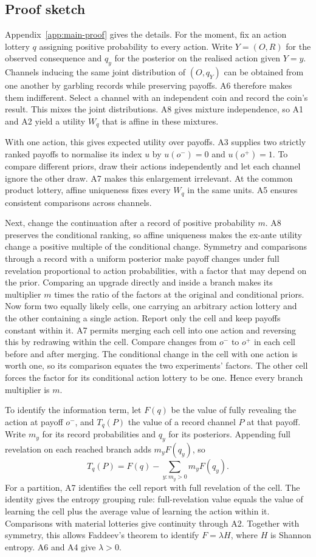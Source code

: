 \documentclass[11pt,a4paper]{article}
\theoremstyle{definition}
\newcommand{\1}{\mathbf 1}
\begin{document}
\subsection{Proof sketch}

Appendix~\ref{app:main-proof} gives the details. For the moment, fix an action lottery $q$ assigning positive probability to every action.
Write $Y=(O,R)$ for the observed consequence and $q_y$ for the posterior
on the realised action given $Y=y$. Channels inducing the same joint
distribution of $(O,q_Y)$ can be obtained from one another by garbling
records while preserving payoffs. A6 therefore makes them indifferent.
Select a channel with an independent coin and record the coin's result.
This mixes the joint distributions. A8 gives mixture independence, so A1
and A2 yield a utility $W_q$ that is affine in these mixtures.

With one action, this gives expected utility over payoffs. A3 supplies
two strictly ranked payoffs to normalise its index $u$ by $u(o^-)=0$ and
$u(o^+)=1$. To compare different priors, draw their actions independently
and let each channel ignore the other draw. A7 makes this enlargement
irrelevant. At the common product lottery, affine uniqueness fixes every
$W_q$ in the same units. A5 ensures consistent comparisons across channels.

Next, change the continuation after a record of positive probability $m$.
A8 preserves the conditional ranking, so affine uniqueness makes the
ex-ante utility change a positive multiple of the conditional change.
Symmetry and comparisons through a record with a uniform posterior make payoff changes
under full revelation proportional to action probabilities, with a factor
that may depend on the prior. Comparing an upgrade directly and inside a
branch makes its multiplier $m$ times the ratio of the factors at the original and conditional
priors. Now form two equally likely cells, one carrying an arbitrary action
lottery and the other containing a single action. Report only the cell and
keep payoffs constant within it. A7 permits merging each cell into one action and reversing this by
redrawing within the cell. Compare changes from $o^-$ to $o^+$ in each cell
before and after merging. The conditional change in the cell with one action is worth one,
so its comparison equates the two experiments' factors. The other cell forces the factor for
its conditional action lottery to be one. Hence every branch multiplier is $m$.

To identify the information term, let $F(q)$ be the value of fully revealing the action at
payoff $o^-$, and $T_q(P)$ the value of a record channel $P$ at that payoff.
Write $m_y$ for its record probabilities and $q_y$ for its posteriors.
Appending full revelation on each reached branch adds $m_yF(q_y)$, so
\[
T_q(P)=F(q)-\sum_{y:m_y>0}m_yF(q_y).
\]
For a partition, A7 identifies the cell report with full revelation of
the cell. The identity gives the entropy grouping rule: full-revelation
value equals the value of learning the cell plus the average value of
learning the action within it. Comparisons with material lotteries give
continuity through A2. Together with symmetry, this allows Faddeev's theorem
to identify $F=\lambda H$, where $H$ is Shannon entropy.
A6 and A4 give $\lambda>0$.
\end{document}
